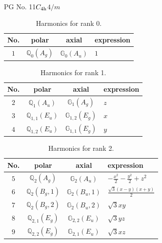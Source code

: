 \documentclass[fleqn,8pt,landscape]{jsarticle}
\begin{document}
\setcounter{MaxMatrixCols}{32}

\renewcommand{\tablename}{Table~}
\renewcommand{\figurename}{Figure~}
\begin{center}
\LARGE
PG No. 11\quad$C_{\rm 4h}$\quad$4/m$\quad[ tetragonal ]
\end{center}
\begin{table}[ht!]
\begin{center}
\caption{Harmonics for rank 0.}
\renewcommand{\arraystretch}{1.3}
\begin{tabular}{cccl} \hline \hline
No. & polar & axial & expression \\ \hline
$ 1 $ & $ \mathbb{Q}_{0}(A_{g}) $ & $ \mathbb{G}_{0}(A_{u}) $ & $ 1 $ \\
 \hline \hline
\end{tabular}
\end{center}
\end{table}
\begin{table}[ht!]
\begin{center}
\caption{Harmonics for rank 1.}
\renewcommand{\arraystretch}{1.3}
\begin{tabular}{cccl} \hline \hline
No. & polar & axial & expression \\ \hline
$ 2 $ & $ \mathbb{Q}_{1}(A_{u}) $ & $ \mathbb{G}_{1}(A_{g}) $ & $ z $ \\
$ 3 $ & $ \mathbb{Q}_{1,1}(E_{u}) $ & $ \mathbb{G}_{1,2}(E_{g}) $ & $ x $ \\
$ 4 $ & $ \mathbb{Q}_{1,2}(E_{u}) $ & $ \mathbb{G}_{1,1}(E_{g}) $ & $ y $ \\
 \hline \hline
\end{tabular}
\end{center}
\end{table}
\begin{table}[ht!]
\begin{center}
\caption{Harmonics for rank 2.}
\renewcommand{\arraystretch}{1.3}
\begin{tabular}{cccl} \hline \hline
No. & polar & axial & expression \\ \hline
$ 5 $ & $ \mathbb{Q}_{2}(A_{g}) $ & $ \mathbb{G}_{2}(A_{u}) $ & $ - \frac{x^{2}}{2} - \frac{y^{2}}{2} + z^{2} $ \\
$ 6 $ & $ \mathbb{Q}_{2}(B_{g},1) $ & $ \mathbb{G}_{2}(B_{u},1) $ & $ \frac{\sqrt{3} \left(x - y\right) \left(x + y\right)}{2} $ \\
$ 7 $ & $ \mathbb{Q}_{2}(B_{g},2) $ & $ \mathbb{G}_{2}(B_{u},2) $ & $ \sqrt{3} x y $ \\
$ 8 $ & $ \mathbb{Q}_{2,1}(E_{g}) $ & $ \mathbb{G}_{2,2}(E_{u}) $ & $ \sqrt{3} y z $ \\
$ 9 $ & $ \mathbb{Q}_{2,2}(E_{g}) $ & $ \mathbb{G}_{2,1}(E_{u}) $ & $ \sqrt{3} x z $ \\
 \hline \hline
\end{tabular}
\end{center}
\end{table}
\end{document}
